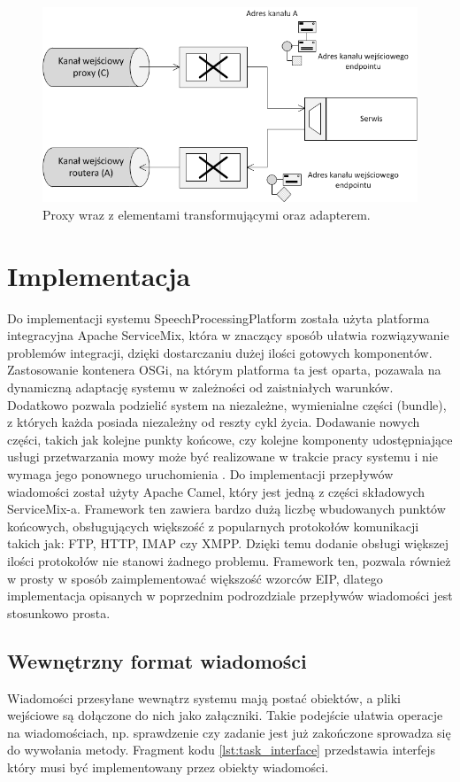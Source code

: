 \begin{figure}[!h]
	\centering
	\includegraphics[scale=0.8]{proxy_layer_flow.png}
	\caption{Proxy wraz z elementami transformującymi oraz adapterem. }\label{fig:servis_proxy}
\end{figure}


\section{Implementacja}

Do implementacji systemu SpeechProcessingPlatform została użyta platforma integracyjna Apache ServiceMix, która w znaczący sposób ułatwia rozwiązywanie problemów integracji, dzięki dostarczaniu dużej ilości gotowych komponentów. Zastosowanie kontenera OSGi, na którym platforma ta jest oparta, pozawala na dynamiczną adaptację systemu w zależności od zaistniałych warunków. Dodatkowo pozwala podzielić system na niezależne, wymienialne części (bundle), z których każda posiada niezależny od reszty cykl życia. Dodawanie nowych części, takich jak kolejne punkty końcowe, czy kolejne komponenty udostępniające usługi przetwarzania mowy może być realizowane w trakcie pracy systemu i nie wymaga jego ponownego uruchomienia \cite{hall2011}. Do implementacji przepływów wiadomości został użyty Apache Camel, który jest jedną z części składowych ServiceMix-a. Framework ten zawiera bardzo dużą liczbę wbudowanych punktów końcowych, obsługujących większość z popularnych protokołów komunikacji takich jak: FTP, HTTP, IMAP czy XMPP. Dzięki temu dodanie obsługi większej ilości protokołów nie stanowi żadnego problemu. Framework ten, pozwala również w prosty w sposób zaimplementować większość wzorców EIP, dlatego implementacja opisanych w poprzednim podrozdziale przepływów wiadomości jest stosunkowo prosta.

\subsection{Wewnętrzny format wiadomości}
Wiadomości przesyłane wewnątrz systemu mają postać obiektów, a pliki wejściowe są dołączone do nich jako załączniki. Takie podejście ułatwia operacje na wiadomościach, np. sprawdzenie czy zadanie jest już zakończone sprowadza się do wywołania metody. Fragment kodu \ref{lst:task_interface} przedstawia interfejs który musi być implementowany przez obiekty wiadomości.

